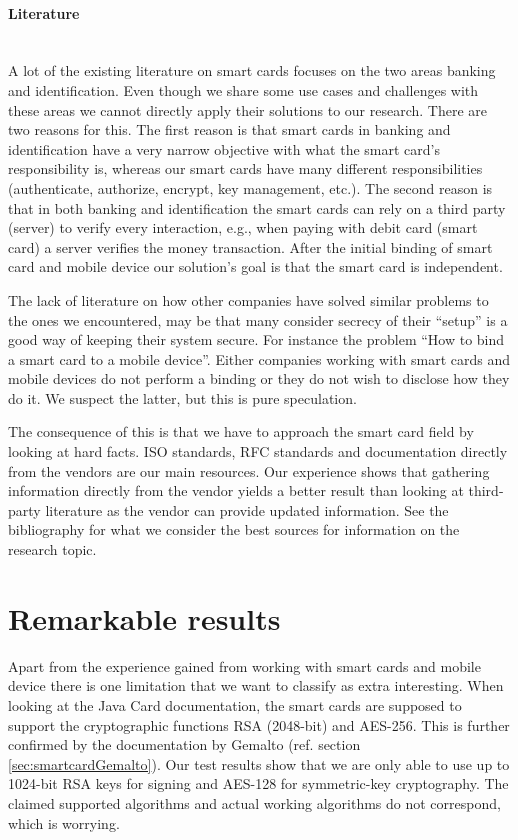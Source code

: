 \paragraph{Literature}\mbox{}\\
A lot of the existing literature on smart cards focuses on the two areas banking and identification. Even though we share some use cases and challenges with these areas we cannot directly apply their solutions to our research. There are two reasons for this. The first reason is that smart cards in banking and identification have a very narrow objective with what the smart card's responsibility is, whereas our smart cards have many different responsibilities (authenticate, authorize, encrypt, key management, etc.). The second reason is that in both banking and identification the smart cards can rely on a third party (server) to verify every interaction, e.g., when paying with debit card (smart card) a server verifies the money transaction. After the initial binding of smart card and mobile device our solution's goal is that the smart card is independent.

The lack of literature on how other companies have solved similar problems to the ones we encountered, may be that many consider secrecy of their ``setup'' is a good way of keeping their system secure. For instance the problem ``How to bind a smart card to a mobile device''. Either companies working with smart cards and mobile devices do not perform a binding or they do not wish to disclose how they do it. We suspect the latter, but this is pure speculation.

The consequence of this is that we have to approach the smart card field by looking at hard facts. ISO standards, RFC standards and documentation directly from the vendors are our main resources. Our experience shows that gathering information directly from the vendor yields a better result than looking at third-party literature as the vendor can provide updated information. See the bibliography for what we consider the best sources for information on the research topic.

\section{Remarkable results}
Apart from the experience gained from working with smart cards and mobile device there is one limitation that we want to classify as extra interesting. When looking at the Java Card documentation, the smart cards are supposed to support the cryptographic functions RSA (2048-bit) and AES-256. This is further confirmed by the documentation by Gemalto (ref. section \ref{sec:smartcardGemalto}). Our test results show that we are only able to use up to 1024-bit RSA keys for signing and AES-128 for symmetric-key cryptography. The claimed supported algorithms and actual working algorithms do not correspond, which is worrying.

